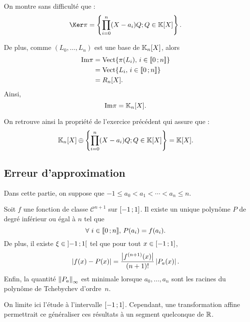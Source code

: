 \begin{remarque}
On montre sans difficulté que :
\[
\Ker \pi = \left\{ \prod_{i=0}^n (X - a_i) Q ; Q \in \K[X] \right\}.
\]

De plus, comme $(L_0,\ldots,L_n)$ est une base de $\mathbb{K}_n[X]$, alors
\begin{align*}
\mathrm{Im} \pi &= \mathrm{Vect}\{\pi(L_i),\, i \in \llbracket 0\,; n \rrbracket\} \\
&= \mathrm{Vect}\{L_i,\, i \in \llbracket 0\,; n \rrbracket\} \\
&= R_n[X].
\end{align*}
Ainsi,
\[
\mathrm{Im} \pi = \mathbb{K}_n[X].
\]

On retrouve ainsi la propriété de l'exercice précédent qui assure que :
\[
\mathbb{K}_n[X] \oplus \left\{ \prod_{i=0}^n (X - a_i) Q ; Q \in \mathbb{K}[X] \right\} = \mathbb{K}[X].
\]
\end{remarque}

\subsection{Erreur d'approximation}

Dans cette partie, on suppose que $-1 \leq a_0 < a_1 < \cdots < a_n \leq n$.

\begin{theo}
Soit $f$ une fonction de classe $\mathscr{C}^{n+1}$ sur $\left[-1\,;1\right]$. Il existe un unique polynôme $P$ de degré inférieur ou égal à $n$ tel que
\[
\forall\, i \in \interent{0}{n},\, P(a_i) = f(a_i).
\]
De plus, il existe $\xi \in \left]-1\,;1\right[$ tel que pour tout $x \in \left[-1\,;1\right]$,
\[
\left| f(x) - P(x) \right| = \frac{\left| f^{(n+1)}(x) \right|}{(n+1)!} \left| P_a(x) \right|.
\]
Enfin, la quantité $\norm{P_a}_\infty$ est minimale lorsque $a_0,\ldots,a_n$ sont les racines du polynôme de Tchebychev d'ordre~$n$.
\end{theo}

\begin{remarque}
On limite ici l'étude à l'intervalle $\left[-1\,;1\right]$. Cependant, une transformation affine permettrait ce généraliser ces résultats à un segment quelconque de $\mathbb{R}$.
\end{remarque}


